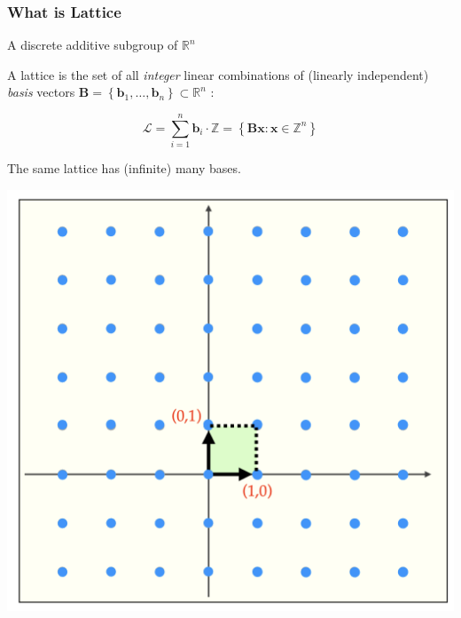 \documentclass{beamer}
\begin{document}
\begin{frame}
	\frametitle{What is Lattice}
	\begin{definition}[Lattice]
		A discrete additive subgroup of $\mathbb{R}^n$
		
			A lattice is the set of all \emph{integer} linear combinations of (linearly independent) \emph{basis} vectors $\mathbf{B}=\left\{\mathbf{b}_1, \ldots, \mathbf{b}_n\right\} \subset \mathbb{R}^n$ :

$$
\mathcal{L}=\sum_{i=1}^n \mathbf{b}_i \cdot \mathbb{Z}=\left\{\mathbf{B} \mathbf{x}: \mathbf{x} \in \mathbb{Z}^n\right\}
$$
	\end{definition}


The same lattice has (infinite) many bases.

\centering
\includegraphics[scale=0.2]{lattice.png}
\end{frame}
\end{document}
